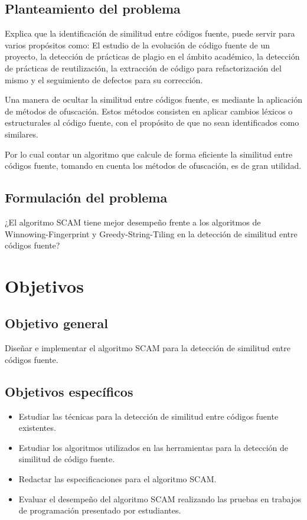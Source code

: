 \subsection{Planteamiento del problema}
\cite{Cheers2021} Explica que la identificación de similitud entre códigos fuente, puede servir para varios propósitos como: El estudio de la evolución de código fuente de un proyecto, la detección de prácticas de plagio en el ámbito académico, la detección de prácticas de reutilización, la extracción de código para refactorización del mismo y el seguimiento de defectos para su corrección.

Una manera de ocultar la similitud entre códigos fuente, es mediante la aplicación de métodos de ofuscación. Estos métodos consisten en aplicar cambios léxicos o estructurales al código fuente, con el propósito de que no sean identificados como similares.

Por lo cual contar un algoritmo que calcule de forma eficiente la similitud entre códigos fuente, tomando en cuenta los métodos de ofuscación, es de gran utilidad.

\subsection{Formulación del problema}
¿El algoritmo SCAM tiene mejor desempeño frente a los algoritmos de Winnowing-Fingerprint y Greedy-String-Tiling en la detección de similitud entre códigos fuente?
\section{Objetivos}
\subsection{Objetivo general}
Diseñar e implementar el algoritmo SCAM para la detección de similitud entre códigos fuente.
\subsection{Objetivos específicos}
\begin{itemize}
    \item Estudiar las técnicas para la detección de similitud entre códigos fuente existentes.
    \item Estudiar los algoritmos utilizados en las herramientas para la detección de similitud de código fuente.
    \item Redactar las especificaciones para el algoritmo SCAM.
    \item Evaluar el desempeño del algoritmo SCAM realizando las pruebas en trabajos de programación presentado por estudiantes.
\end{itemize}

